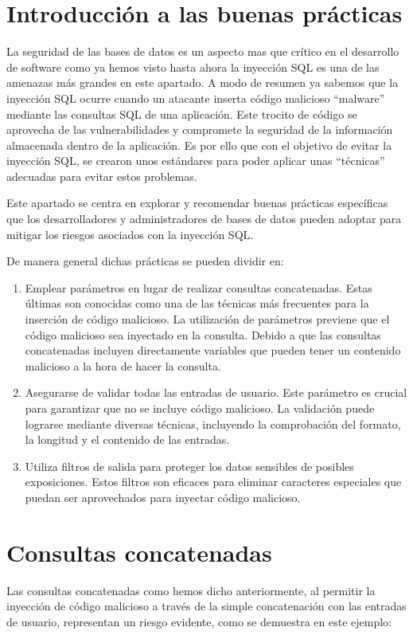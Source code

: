\documentclass[11pt]{report}
\begin{document}
\section{Introducción a las buenas prácticas}
La seguridad de las bases de datos es un aspecto mas que crítico en el desarrollo de software como ya hemos visto hasta ahora la inyección SQL es una de las amenazas más grandes en este apartado. A modo de resumen ya sabemos que la inyección SQL ocurre cuando un atacante inserta código malicioso “malware” mediante las consultas SQL de una aplicación. Este trocito de código se aprovecha de las vulnerabilidades y compromete la seguridad de la información almacenada dentro de la aplicación. Es por ello que con el objetivo de evitar la inyección SQL, se crearon unos estándares para poder aplicar unas “técnicas” adecuadas para evitar estos problemas. 

Este apartado se centra en explorar y recomendar buenas prácticas específicas que los desarrolladores y administradores de bases de datos pueden adoptar para mitigar los riesgos asociados con la inyección SQL.

De manera general dichas prácticas se pueden dividir en:


\begin{enumerate}
  \item Emplear parámetros en lugar de realizar consultas concatenadas. Estas últimas son conocidas como una de las técnicas más frecuentes para la inserción de código malicioso. 
  La utilización de parámetros previene que el código malicioso sea inyectado en la consulta. Debido a que las consultas concatenadas incluyen directamente variables que pueden 
  tener un contenido malicioso a la hora de hacer la consulta.

  \item Asegurarse de validar todas las entradas de usuario. Este parámetro es crucial para garantizar
  que no se incluye código malicioso. La validación puede lograrse mediante diversas técnicas, incluyendo
  la comprobación del formato, la longitud y el contenido de las entradas.
  
  \item Utiliza filtros de salida para proteger los datos sensibles de posibles exposiciones. Estos
  filtros son eficaces para eliminar caracteres especiales que puedan ser aprovechados para inyectar
  código malicioso.
\end{enumerate}

\section{Consultas concatenadas}
Las consultas concatenadas como hemos dicho anteriormente, al permitir la inyección de código malicioso a
través de la simple concatenación con las entradas de usuario, representan un riesgo evidente, como se 
demuestra en este ejemplo:
\end{document}
